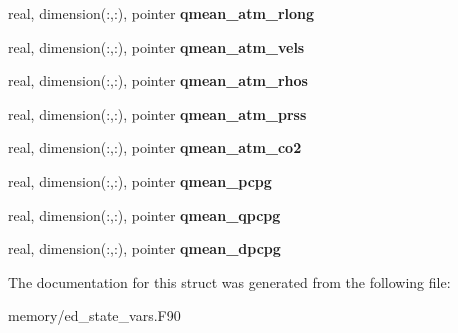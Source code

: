 \begin{DoxyCompactItemize}
\item 
\hypertarget{structed__state__vars_1_1polygontype_a92a7d3ce6eabd0105ac5aea59584b775}{
real, dimension(:,:), pointer {\bfseries qmean\_\-atm\_\-rlong}}
\label{structed__state__vars_1_1polygontype_a92a7d3ce6eabd0105ac5aea59584b775}

\item 
\hypertarget{structed__state__vars_1_1polygontype_ad3fe44eb61997510c4647df737833255}{
real, dimension(:,:), pointer {\bfseries qmean\_\-atm\_\-vels}}
\label{structed__state__vars_1_1polygontype_ad3fe44eb61997510c4647df737833255}

\item 
\hypertarget{structed__state__vars_1_1polygontype_a292e425f65407adb2ef6ec5496cc3701}{
real, dimension(:,:), pointer {\bfseries qmean\_\-atm\_\-rhos}}
\label{structed__state__vars_1_1polygontype_a292e425f65407adb2ef6ec5496cc3701}

\item 
\hypertarget{structed__state__vars_1_1polygontype_a89bb17af9068459cae9f8f370ec19bb6}{
real, dimension(:,:), pointer {\bfseries qmean\_\-atm\_\-prss}}
\label{structed__state__vars_1_1polygontype_a89bb17af9068459cae9f8f370ec19bb6}

\item 
\hypertarget{structed__state__vars_1_1polygontype_ae6ec12c0268bbed1144b414cd4ef8070}{
real, dimension(:,:), pointer {\bfseries qmean\_\-atm\_\-co2}}
\label{structed__state__vars_1_1polygontype_ae6ec12c0268bbed1144b414cd4ef8070}

\item 
\hypertarget{structed__state__vars_1_1polygontype_aa0bec83993f6af1e73ef64b31550621c}{
real, dimension(:,:), pointer {\bfseries qmean\_\-pcpg}}
\label{structed__state__vars_1_1polygontype_aa0bec83993f6af1e73ef64b31550621c}

\item 
\hypertarget{structed__state__vars_1_1polygontype_a2a97ab537576b6129e66f2b864a43105}{
real, dimension(:,:), pointer {\bfseries qmean\_\-qpcpg}}
\label{structed__state__vars_1_1polygontype_a2a97ab537576b6129e66f2b864a43105}

\item 
\hypertarget{structed__state__vars_1_1polygontype_a554e1d6e10d1409b640a781673e308eb}{
real, dimension(:,:), pointer {\bfseries qmean\_\-dpcpg}}
\label{structed__state__vars_1_1polygontype_a554e1d6e10d1409b640a781673e308eb}

\end{DoxyCompactItemize}


The documentation for this struct was generated from the following file:\begin{DoxyCompactItemize}
\item 
memory/ed\_\-state\_\-vars.F90\end{DoxyCompactItemize}
